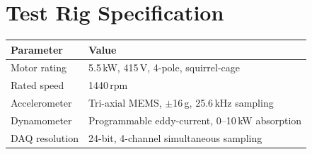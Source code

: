\chapter{Test Rig Specification}
\begin{tabularx}{\textwidth}{@{}l X@{}}
\toprule
\textbf{Parameter} & \textbf{Value} \\
\midrule
Motor rating & 5.5\,kW, 415\,V, 4-pole, squirrel-cage \\
Rated speed & 1440\,rpm \\
Accelerometer & Tri-axial MEMS, $\pm$16\,g, 25.6\,kHz sampling \\
Dynamometer & Programmable eddy-current, 0--10\,kW absorption \\
DAQ resolution & 24-bit, 4-channel simultaneous sampling \\
\bottomrule
\end{tabularx}
